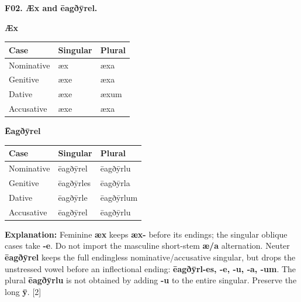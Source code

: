 \par\begin{minipage}{\linewidth}\raggedright
\textbf{F02. Æx and ēagðȳrel.}

\textbf{Æx}

\par\begingroup
\fontsize{10.5}{13.2}\selectfont
\setlength{\LTleft}{0pt}\setlength{\LTright}{\fill}
\noindent
\begin{tabular}{@{}>{\raggedright\arraybackslash}p{39.46mm}>{\raggedright\arraybackslash}p{39.46mm}>{\raggedright\arraybackslash}p{39.46mm}@{}}
\toprule
\textbf{Case} & \textbf{Singular} & \textbf{Plural} \\
\midrule
Nominative & æx & æxa \\
Genitive & æxe & æxa \\
Dative & æxe & æxum \\
Accusative & æxe & æxa \\
\bottomrule
\end{tabular}
\par\endgroup

\textbf{Ēagðȳrel}

\par\begingroup
\fontsize{10.5}{13.2}\selectfont
\setlength{\LTleft}{0pt}\setlength{\LTright}{\fill}
\noindent
\begin{tabular}{@{}>{\raggedright\arraybackslash}p{39.46mm}>{\raggedright\arraybackslash}p{39.46mm}>{\raggedright\arraybackslash}p{39.46mm}@{}}
\toprule
\textbf{Case} & \textbf{Singular} & \textbf{Plural} \\
\midrule
Nominative & ēagðȳrel & ēagðȳrlu \\
Genitive & ēagðȳrles & ēagðȳrla \\
Dative & ēagðȳrle & ēagðȳrlum \\
Accusative & ēagðȳrel & ēagðȳrlu \\
\bottomrule
\end{tabular}
\par\endgroup

\textbf{Explanation:} Feminine \textbf{æx} keeps \textbf{æx-} before its endings; the singular oblique cases take \textbf{-e}. Do not import the masculine short-stem \textbf{æ/\allowbreak{}a} alternation. Neuter \textbf{ēagðȳrel} keeps the full endingless nominative/\allowbreak{}accusative singular, but drops the unstressed vowel before an inflectional ending: \textbf{ēagðȳrl-es, -e, -u, -a, -um}. The plural \textbf{ēagðȳrlu} is not obtained by adding \textbf{-u} to the entire singular. Preserve the long \textbf{ȳ}. [2]

\end{minipage}\par\addvspace{4pt}

